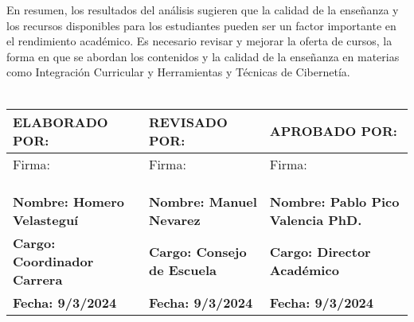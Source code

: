 En resumen, los resultados del análisis sugieren que la calidad de la enseñanza y los recursos disponibles para los estudiantes pueden ser un factor importante en el rendimiento académico. Es necesario revisar y mejorar la oferta de cursos, la forma en que se abordan los contenidos y la calidad de la enseñanza en materias como Integración Curricular y Herramientas y Técnicas de Cibernetía.\\
\vspace{1cm}\\\begin{tabularx}{\textwidth}{|X|X|X|}
\hline
\textbf{ELABORADO POR:} & \textbf{REVISADO POR:} & \textbf{APROBADO POR:} \\ \hline
Firma: & Firma: & Firma:\\
&&\\
&&\\
&&\\ \hline
\textbf{Nombre: Homero Velasteguí} & \textbf{Nombre: Manuel Nevarez} & \textbf{Nombre: Pablo Pico Valencia PhD.} \\ \hline
\textbf{Cargo: Coordinador Carrera} & \textbf{Cargo: Consejo de Escuela} & \textbf{Cargo: Director Académico} \\ \hline
\textbf{Fecha: 9/3/2024} & \textbf{Fecha: 9/3/2024} & \textbf{Fecha: 9/3/2024} \\ \hline
\end{tabularx}

